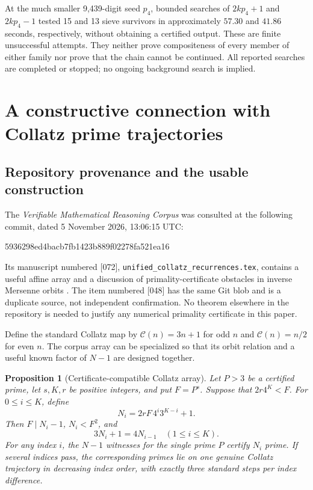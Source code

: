 \documentclass[11pt,a4paper]{article}
\newtheorem{proposition}[theorem]{Proposition}
\theoremstyle{definition}\newtheorem{definition}[theorem]{Definition}
\theoremstyle{remark}\newtheorem{remark}[theorem]{Remark}
\begin{document}
At the much smaller 9,439-digit seed $p_4$, bounded searches of
$2kp_4+1$ and $2kp_4-1$ tested 15 and 13 sieve survivors in approximately
$57.30$ and $41.86$ seconds, respectively, without obtaining a certified
output. These are finite unsuccessful attempts. They neither prove
compositeness of every member of either family nor prove that the chain
cannot be continued. All reported searches are completed or stopped; no
ongoing background search is implied.

\section{A constructive connection with Collatz prime trajectories}
\label{sec:collatz}

\subsection{Repository provenance and the usable construction}

The \emph{Verifiable Mathematical Reasoning Corpus} was consulted at the
following commit, dated 5 November 2026, 13:06:15 UTC:
\begin{center}\small\ttfamily
5936298ed4bacb7fb1423b889f02278fa521ea16
\end{center}
Its manuscript numbered [072],
\texttt{unified\_collatz\_recurrences.tex}, contains a useful affine
array and a discussion of primality-certificate obstacles in inverse
Mersenne orbits \cite{corpus}. The item numbered [048] has the same Git blob
and is a duplicate source, not independent confirmation. No theorem elsewhere
in the repository is needed to justify any numerical primality certificate
in this paper.

Define the standard Collatz map by $\mathcal C(n)=3n+1$ for odd $n$ and
$\mathcal C(n)=n/2$ for even $n$. The corpus array can be specialized so
that its orbit relation and a useful known factor of $N-1$ are designed
together.

\begin{proposition}[Certificate-compatible Collatz array]\label{prop:collatz}
Let $P>3$ be a certified prime, let $s,K,r$ be positive integers, and put
$F=P^s$. Suppose that
$2r4^K<F$. For $0\le i\le K$, define
\[
 N_i=2rF\,4^i3^{K-i}+1.
\]
Then $F\mid N_i-1$, $N_i<F^2$, and
\begin{equation}\label{eq:collatz-array}
 3N_i+1=4N_{i-1}\quad(1\le i\le K).
\end{equation}
For any index $i$, the $N-1$ witnesses for the single prime $P$ certify $N_i$
prime. If several indices pass, the corresponding primes lie on one genuine
Collatz trajectory in decreasing index order, with exactly three standard
steps per index difference.
\end{proposition}
\end{document}
